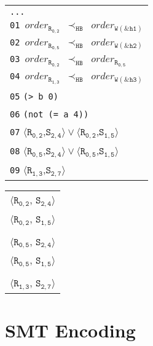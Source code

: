 \newsavebox{\boxSMTc}
\begin{lrbox}{\boxSMTc}
\normalsize
\begin{tabular}[t]{l}
\texttt{...} \\
\texttt{01 $\mathit{order_\mathtt{R_{0,2}}}$ $\mathtt{\prec_\mathtt{HB}}$ $\mathit{order_\mathtt{W(\&h1)}}$}\\
\texttt{02 $\mathit{order_\mathtt{R_{0,5}}}$ $\mathtt{\prec_\mathtt{HB}}$ $\mathit{order_\mathtt{W(\&h2)}}$}\\
\texttt{03 $\mathit{order_\mathtt{R_{0,2}}}$ $\mathtt{\prec_\mathtt{HB}}$ $\mathit{order_\mathtt{R_{0,5}}}$}\\
\texttt{04 $\mathit{order_\mathtt{R_{1,3}}}$ $\mathtt{\prec_\mathtt{HB}}$ $\mathit{order_\mathtt{W(\&h3)}}$}\\
\texttt{05} \texttt{(> b 0)}\\
\texttt{06} \texttt{(not (= a 4))}\\
\texttt{07} $\langle\mathtt{R_{0,2}}$,$\mathtt{S_{2,4}}\rangle\vee\langle\mathtt{R_{0,2}}$,$\mathtt{S_{1,5}}\rangle$\\
\texttt{08} $\langle\mathtt{R_{0,5}}$,$\mathtt{S_{2,4}}\rangle\vee\langle\mathtt{R_{0,5}}$,$\mathtt{S_{1,5}}\rangle$\\
\texttt{09} $\langle\mathtt{R_{1,3}}$,$\mathtt{S_{2,7}}\rangle$
\end{tabular}
\end{lrbox}

\newsavebox{\boxMP}
\begin{lrbox}{\boxMP}
\normalsize
\begin{tabular}[t]{l}
$\langle\mathtt{R_{0,2}}$, $\mathtt{S_{2,4}}\rangle$\\
$\langle\mathtt{R_{0,2}}$, $\mathtt{S_{1,5}}\rangle$\\
\\
$\langle\mathtt{R_{0,5}}$, $\mathtt{S_{2,4}}\rangle$\\
$\langle\mathtt{R_{0,5}}$, $\mathtt{S_{1,5}}\rangle$\\
\\
$\langle\mathtt{R_{1,3}}$, $\mathtt{S_{2,7}}\rangle$\\
\end{tabular}
\end{lrbox}

\section{SMT Encoding}\label{sec:smt}

